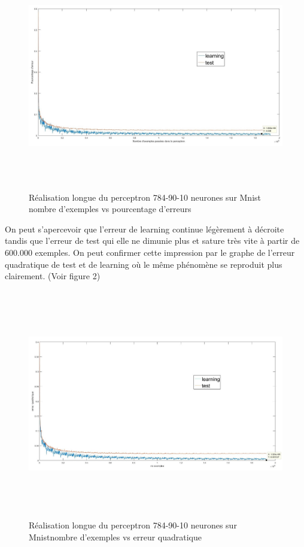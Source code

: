 \documentclass[a4paper,twoside]{report}
\begin{document}
\begin{figure}[!h]
	\begin{center}
		\includegraphics[width=17cm,height=10cm]{Images/courbes_error_longue.jpg} 
		\caption{Réalisation longue du perceptron 784-90-10 neurones sur Mnist nombre d'exemples vs pourcentage d'erreurs}
	\end{center}
\end{figure}


On peut s'apercevoir que l'erreur de learning continue légèrement à décroite tandis que l'erreur de test qui elle ne dimunie plus et sature très vite à partir de 600.000 exemples. On peut confirmer cette impression par le graphe de l'erreur quadratique de test et de learning où le même phénomène se reproduit plus clairement.
(Voir figure 2)  


\begin{figure}[!h]
	\begin{center}
	\includegraphics[width=17cm,height=10cm]{Images/courbes_quaderror_longue.jpg} 
	\caption{Réalisation longue du perceptron 784-90-10 neurones sur Mnistnombre d'exemples vs erreur quadratique} 
	\end{center}
\end{figure}
\end{document}
